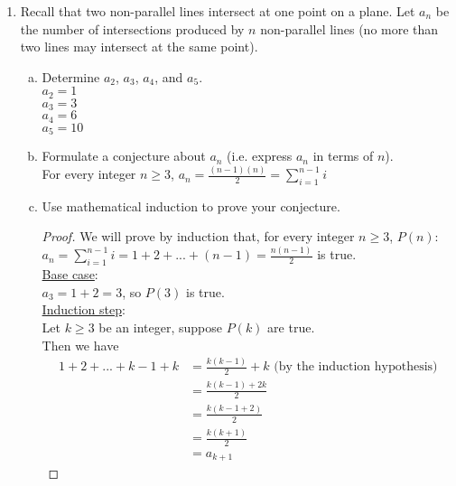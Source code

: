 \documentclass[12pt]{amsart}
\begin{document}
\begin{enumerate}[{\bfseries 1.}]
\newpage
\item Recall that \footnotemark[2]two non-parallel lines intersect at one point on a plane.  Let $a_{n}$ be the number of intersections produced by $n$ non-parallel lines (no more than two lines may intersect at the same point).

	\begin{enumerate}[(a)]
	\vspace{0.1in}
	\item Determine $a_{2}$, $a_{3}$, $a_{4}$, and $a_{5}$.
		\\$a_{2} = 1$
		\\$a_{3} = 3$
		\\$a_{4} = 6$
		\\$a_{5} = 10$

	\vspace{0.1in}
	\item \footnotemark[3]Formulate a conjecture about $a_{n}$ (i.e. express $a_{n}$ in terms of $n$).
		\\For every integer $n\geq 3$, $a_{n} = \frac{(n-1)(n)}{2} =  \displaystyle\sum_{i=1}^{n-1}i$

	\vspace{0.1in}
	\item Use mathematical induction to prove your conjecture.
		\begin{proof}
    	\vspace{0.1in}
    	We will prove by induction that, for every integer $n \geq 3$, $P(n)$: $a_{n} =  \displaystyle\sum_{i=1}^{n-1}i = 1 + 2 + ... + (n-1) = \frac{n(n-1)}{2}$ is true.
    	\\\underline{Base case}:
    	\\$a_{3} = 1 + 2 = 3$, so $P(3)$ is true.
    	\\\underline{Induction step}:
    	\\Let $k\geq 3$ be an integer, suppose $P(k)$ are true.
    	\\Then we have
		\begin{align*}
	    1 + 2 + ... + k-1 + k &= \frac{k(k-1)}{2} + k\text{ (by the induction hypothesis)} \\
		&= \frac{k(k-1)+2k}{2} \\
		&= \frac{k(k-1+2)}{2}\\
		&= \frac{k(k+1)}{2} \\
		&= a_{k+1}
		\end{align*}
		\end{proof}
	\end{enumerate}
\end{enumerate}
\end{document}
